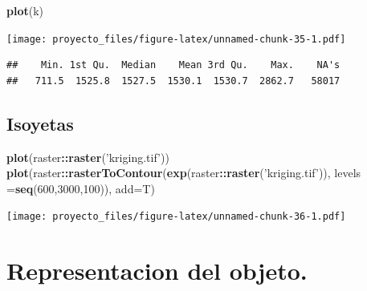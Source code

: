 \documentclass[11pt,]{article}
\newenvironment{Shaded}{\begin{snugshade}}{\end{snugshade}}
\newcommand{\KeywordTok}[1]{\textcolor[rgb]{0.13,0.29,0.53}{\textbf{#1}}}
\newcommand{\DataTypeTok}[1]{\textcolor[rgb]{0.13,0.29,0.53}{#1}}
\newcommand{\DecValTok}[1]{\textcolor[rgb]{0.00,0.00,0.81}{#1}}
\newcommand{\StringTok}[1]{\textcolor[rgb]{0.31,0.60,0.02}{#1}}
\newcommand{\OperatorTok}[1]{\textcolor[rgb]{0.81,0.36,0.00}{\textbf{#1}}}
\newcommand{\NormalTok}[1]{#1}
\begin{document}
\begin{Shaded}
\begin{Highlighting}[]
\KeywordTok{plot}\NormalTok{(k)}
\end{Highlighting}
\end{Shaded}

\texttt{[image: proyecto\_files/figure-latex/unnamed-chunk-35-1.pdf]}

\begin{Shaded}
\end{Shaded}

\begin{verbatim}
##    Min. 1st Qu.  Median    Mean 3rd Qu.    Max.    NA's 
##   711.5  1525.8  1527.5  1530.1  1530.7  2862.7   58017
\end{verbatim}

\subsection{Isoyetas}\label{isoyetas}

\begin{Shaded}
\begin{Highlighting}[]
\KeywordTok{plot}\NormalTok{(raster}\OperatorTok{::}\KeywordTok{raster}\NormalTok{(}\StringTok{'kriging.tif'}\NormalTok{))}
\KeywordTok{plot}\NormalTok{(raster}\OperatorTok{::}\KeywordTok{rasterToContour}\NormalTok{(}\KeywordTok{exp}\NormalTok{(raster}\OperatorTok{::}\KeywordTok{raster}\NormalTok{(}\StringTok{'kriging.tif'}\NormalTok{)), }\DataTypeTok{levels =}\KeywordTok{seq}\NormalTok{(}\DecValTok{600}\NormalTok{,}\DecValTok{3000}\NormalTok{,}\DecValTok{100}\NormalTok{)), }\DataTypeTok{add=}\NormalTok{T)}
\end{Highlighting}
\end{Shaded}

\texttt{[image: proyecto\_files/figure-latex/unnamed-chunk-36-1.pdf]}

\section{Representacion del objeto.}\label{representacion-del-objeto.}
\end{document}
